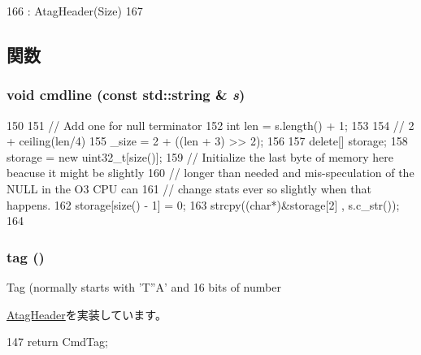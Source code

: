 \begin{DoxyCode}
166         : AtagHeader(Size)
167     {}
\end{DoxyCode}


\subsection{関数}
\hypertarget{classAtagCmdline_ae151a0716df5ef8d2f9f327b5a10106d}{
\subsubsection[{cmdline}]{\setlength{\rightskip}{0pt plus 5cm}void cmdline (const std::string \& {\em s})}}
\label{classAtagCmdline_ae151a0716df5ef8d2f9f327b5a10106d}



\begin{DoxyCode}
150     {
151         // Add one for null terminator
152         int len = s.length() + 1;
153 
154         // 2 + ceiling(len/4)
155         _size = 2 + ((len + 3) >> 2);
156 
157         delete[] storage;
158         storage = new uint32_t[size()];
159         // Initialize the last byte of memory here beacuse it might be slightly
160         // longer than needed and mis-speculation of the NULL in the O3 CPU can
161         // change stats ever so slightly when that happens.
162         storage[size() - 1] = 0;
163         strcpy((char*)&storage[2] , s.c_str());
164     }
\end{DoxyCode}
\hypertarget{classAtagCmdline_afe29fbb80b1d2765e37e98c6d259ea52}{
\subsubsection[{tag}]{ tag ()}}
\label{classAtagCmdline_afe29fbb80b1d2765e37e98c6d259ea52}
Tag (normally starts with 'T''A' and 16 bits of number 

\hyperlink{classAtagHeader_adad80b4c3e973afddab9e70f05faecd9}{AtagHeader}を実装しています。


\begin{DoxyCode}
147 { return CmdTag; }
\end{DoxyCode}


